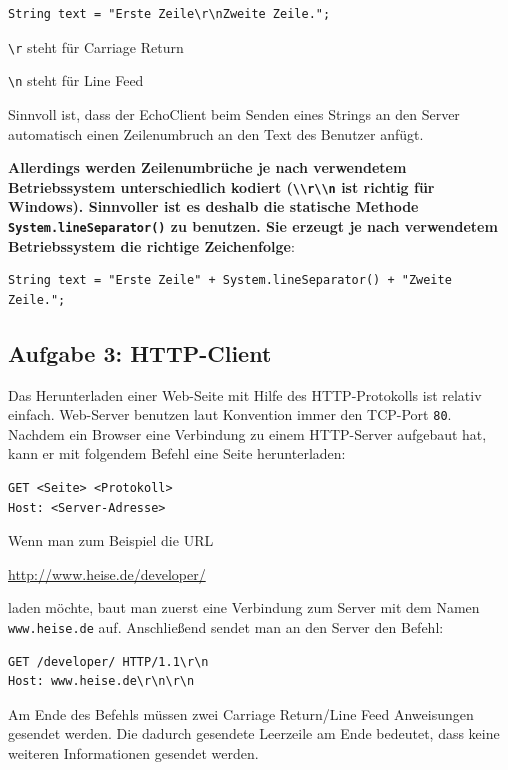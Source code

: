 \begin{lstlisting}
String text = "Erste Zeile\r\nZweite Zeile.";
\end{lstlisting}

\lstinline|\r| steht für Carriage Return

\lstinline|\n| steht für Line Feed

Sinnvoll ist, dass der EchoClient beim Senden eines Strings an den Server
automatisch einen Zeilenumbruch an den Text des Benutzer anfügt.

\textbf{Allerdings werden Zeilenumbrüche je nach verwendetem Betriebssystem
unterschiedlich kodiert (\lstinline|\\r\\n| ist richtig für Windows).
Sinnvoller ist es deshalb die statische Methode
\lstinline|System.lineSeparator()| zu benutzen. Sie erzeugt je nach verwendetem
Betriebssystem die richtige Zeichenfolge}:

\begin{lstlisting}
String text = "Erste Zeile" + System.lineSeparator() + "Zweite Zeile.";
\end{lstlisting}


\subsection{Aufgabe 3: HTTP-Client}

Das Herunterladen einer Web-Seite mit Hilfe des HTTP-Protokolls ist relativ
einfach. Web-Server benutzen laut Konvention immer den TCP-Port \lstinline|80|.
Nachdem ein Browser eine Verbindung zu einem HTTP-Server aufgebaut hat, kann er
mit folgendem Befehl eine Seite herunterladen:

\begin{lstlisting}
GET <Seite> <Protokoll>
Host: <Server-Adresse>
\end{lstlisting}

Wenn man zum Beispiel die URL 

\url{http://www.heise.de/developer/}

laden möchte, baut man zuerst eine Verbindung zum Server mit dem Namen
\lstinline|www.heise.de| auf. Anschließend sendet man an den Server den Befehl:

\begin{lstlisting}
GET /developer/ HTTP/1.1\r\n
Host: www.heise.de\r\n\r\n
\end{lstlisting}

Am Ende des Befehls müssen zwei Carriage Return/Line Feed Anweisungen gesendet
werden. Die dadurch gesendete Leerzeile am Ende bedeutet, dass keine weiteren
Informationen gesendet werden.

